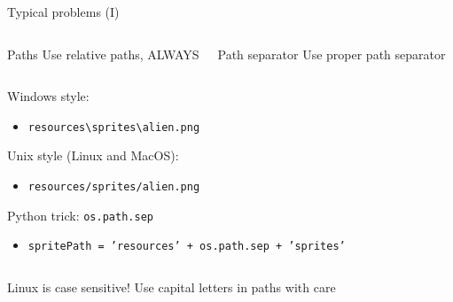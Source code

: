 \documentclass[10pt,compress]{beamer} %
\begin{document}
\begin{frame}[fragile]{Typical problems (I)}
    \begin{columns}
		\begin{alertblock}{Paths}
		Use relative paths, ALWAYS
		\end{alertblock}

		\begin{alertblock}{Path separator}
		Use proper path separator
		\end{alertblock}
   	\end{columns}

	\bigskip

	Windows style:
	\begin{itemize}
	\item \texttt{resources\textbackslash sprites\textbackslash alien.png}
	\end{itemize}

	Unix style (Linux and MacOS):
	\begin{itemize}
	\item \texttt{resources/sprites/alien.png}
	\end{itemize}

	Python trick: \texttt{os.path.sep}
	\begin{itemize}
		\item \texttt{spritePath = 'resources' + os.path.sep + 'sprites'}
	\end{itemize}

    \begin{columns}
		\begin{alertblock}{}
	    Linux is case sensitive! Use capital letters in paths with care
		\end{alertblock}
   	\end{columns}
\end{frame}
\end{document}

